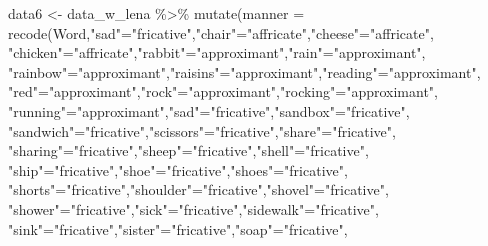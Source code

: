 \documentclass[
]{article}
\newenvironment{Shaded}{\begin{snugshade}}{\end{snugshade}}
\newcommand{\AttributeTok}[1]{\textcolor[rgb]{0.77,0.63,0.00}{#1}}
\newcommand{\FunctionTok}[1]{\textcolor[rgb]{0.00,0.00,0.00}{#1}}
\newcommand{\NormalTok}[1]{#1}
\newcommand{\OtherTok}[1]{\textcolor[rgb]{0.56,0.35,0.01}{#1}}
\newcommand{\SpecialCharTok}[1]{\textcolor[rgb]{0.00,0.00,0.00}{#1}}
\newcommand{\StringTok}[1]{\textcolor[rgb]{0.31,0.60,0.02}{#1}}
\begin{document}
\begin{Shaded}
\begin{Highlighting}[]
\NormalTok{data6 }\OtherTok{\textless{}{-}}\NormalTok{ data\_w\_lena }\SpecialCharTok{\%\textgreater{}\%}
  \FunctionTok{mutate}\NormalTok{(}\AttributeTok{manner =} \FunctionTok{recode}\NormalTok{(Word,}\StringTok{"sad"}\OtherTok{=}\StringTok{"fricative"}\NormalTok{,}\StringTok{"chair"}\OtherTok{=}\StringTok{"affricate"}\NormalTok{,}\StringTok{"cheese"}\OtherTok{=}\StringTok{"affricate"}\NormalTok{,}
                       \StringTok{"chicken"}\OtherTok{=}\StringTok{"affricate"}\NormalTok{,}\StringTok{"rabbit"}\OtherTok{=}\StringTok{"approximant"}\NormalTok{,}\StringTok{"rain"}\OtherTok{=}\StringTok{"approximant"}\NormalTok{,}
                       \StringTok{"rainbow"}\OtherTok{=}\StringTok{"approximant"}\NormalTok{,}\StringTok{"raisins"}\OtherTok{=}\StringTok{"approximant"}\NormalTok{,}\StringTok{"reading"}\OtherTok{=}\StringTok{"approximant"}\NormalTok{,}
                       \StringTok{"red"}\OtherTok{=}\StringTok{"approximant"}\NormalTok{,}\StringTok{"rock"}\OtherTok{=}\StringTok{"approximant"}\NormalTok{,}\StringTok{"rocking"}\OtherTok{=}\StringTok{"approximant"}\NormalTok{,}
                       \StringTok{"running"}\OtherTok{=}\StringTok{"approximant"}\NormalTok{,}\StringTok{"sad"}\OtherTok{=}\StringTok{"fricative"}\NormalTok{,}\StringTok{"sandbox"}\OtherTok{=}\StringTok{"fricative"}\NormalTok{,}
                       \StringTok{"sandwich"}\OtherTok{=}\StringTok{"fricative"}\NormalTok{,}\StringTok{"scissors"}\OtherTok{=}\StringTok{"fricative"}\NormalTok{,}\StringTok{"share"}\OtherTok{=}\StringTok{"fricative"}\NormalTok{,}
                       \StringTok{"sharing"}\OtherTok{=}\StringTok{"fricative"}\NormalTok{,}\StringTok{"sheep"}\OtherTok{=}\StringTok{"fricative"}\NormalTok{,}\StringTok{"shell"}\OtherTok{=}\StringTok{"fricative"}\NormalTok{,}
                       \StringTok{"ship"}\OtherTok{=}\StringTok{"fricative"}\NormalTok{,}\StringTok{"shoe"}\OtherTok{=}\StringTok{"fricative"}\NormalTok{,}\StringTok{"shoes"}\OtherTok{=}\StringTok{"fricative"}\NormalTok{,}
                       \StringTok{"shorts"}\OtherTok{=}\StringTok{"fricative"}\NormalTok{,}\StringTok{"shoulder"}\OtherTok{=}\StringTok{"fricative"}\NormalTok{,}\StringTok{"shovel"}\OtherTok{=}\StringTok{"fricative"}\NormalTok{,}
                             \StringTok{"shower"}\OtherTok{=}\StringTok{"fricative"}\NormalTok{,}\StringTok{"sick"}\OtherTok{=}\StringTok{"fricative"}\NormalTok{,}\StringTok{"sidewalk"}\OtherTok{=}\StringTok{"fricative"}\NormalTok{,}
                             \StringTok{"sink"}\OtherTok{=}\StringTok{"fricative"}\NormalTok{,}\StringTok{"sister"}\OtherTok{=}\StringTok{"fricative"}\NormalTok{,}\StringTok{"soap"}\OtherTok{=}\StringTok{"fricative"}\NormalTok{,}

\end{Highlighting}
\end{Shaded}
\end{document}
